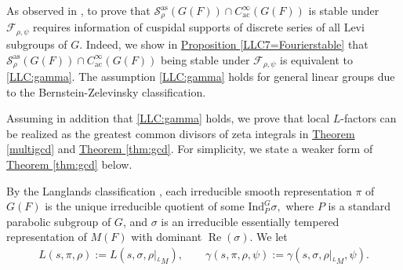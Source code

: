 \documentclass[10pt]{amsart}
\theoremstyle{definition}
\numberwithin{equation}{section}
\numberwithin{equation}{subsection}
\renewcommand{\Re}{\mathop{\mathrm{Re}}}
\begin{document}
As observed in \cite{DRS}, to prove that $\mathcal{S}_\rho^{\mathrm{as}}(G(F))\cap C^\infty_{\mathrm{ac}}(G(F))$ is stable under $\mathcal{F}_{\rho,\psi}$ requires information of cuspidal supports of discrete series of all Levi subgroups of $G$. Indeed, we show in \hyperref[LLC7=Fourierstable]{Proposition \ref{LLC7=Fourierstable}} that $\mathcal{S}_\rho^{\mathrm{as}}(G(F))\cap C^\infty_{\mathrm{ac}}(G(F))$ being stable under $\mathcal{F}_{\rho,\psi}$ is equivalent to \eqref{LLC:gamma}. The assumption \eqref{LLC:gamma} holds for general linear groups \cite[Proposition 3.3]{DRS} due to the Bernstein-Zelevinsky classification. 


 Assuming in addition that \eqref{LLC:gamma} holds, we prove that local $L$-factors can be realized as the greatest common divisors of zeta integrals in \hyperref[multigcd]{Theorem \ref{multigcd}} and \hyperref[thm:gcd]{Theorem \ref{thm:gcd}}. For simplicity, we state a weaker form of \hyperref[thm:gcd]{Theorem \ref{thm:gcd}} below.

By the Langlands classification \cite{Silb:classification, BW:book, Representation-p-adic}, each irreducible smooth representation $\pi$ of $G(F)$ is the unique irreducible quotient of some $\mathrm{Ind}_P^G \sigma,$ where $P$ is a standard parabolic subgroup of $G$, and $\sigma$ is an irreducible essentially tempered representation of $M(F)$ with dominant $\Re(\sigma)$. We let
\begin{align*}
    L(s,\pi,\rho):=L(s,\sigma,\rho|_{{}^LM }),\quad \quad \gamma(s,\pi,\rho,\psi):=\gamma(s,\sigma,\rho|_{{}^L M},\psi).
\end{align*}
\end{document}

